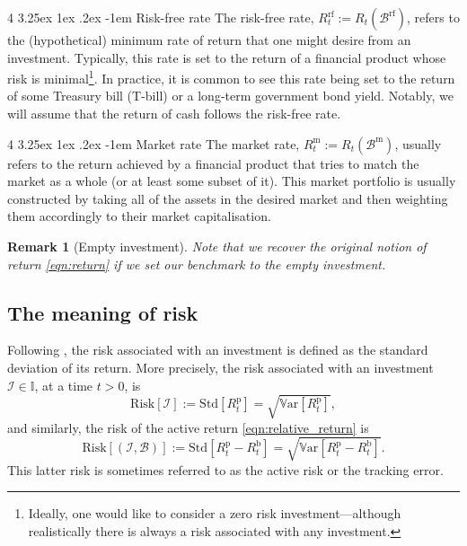 \documentclass[12pt]{article}
\makeatletter
\newtheorem{remark}{Remark}[section]
\renewcommand\paragraph{%
	\@startsection{paragraph}
	{4}
	{\z@}
	{3.25ex \@plus1ex \@minus.2ex}
	{-1em}
	{\normalfont\normalsize\bfseries\maybe@addperiod}%
}
\newcommand{\maybe@addperiod}[1]{%
	#1\@addpunct{.}%
}
\makeatother
\begin{document}
\paragraph{Risk-free rate} The risk-free rate, $R_t^{\text{rf}} := R_t(\mathcal{B}^{\text{rf}})$, refers to the (hypothetical) minimum rate of return that one might desire from an investment. Typically, this rate is set to the return of a financial product whose risk is minimal\footnote{Ideally, one would like to consider a zero risk investment---although realistically there is always a risk associated with any investment.}. In practice, it is common to see this rate being set to the return of some Treasury bill (T-bill) or a long-term government bond yield. Notably, we will assume that the return of cash follows the risk-free rate.

\paragraph{Market rate} The market rate, $R_t^{\text{m}} := R_t(\mathcal{B}^{\text{m}})$, usually refers to the return achieved by a financial product that tries to match the market as a whole (or at least some subset of it). This market portfolio is usually constructed by taking all of the assets in the desired market and then weighting them accordingly to their market capitalisation.

\begin{remark}
	[Empty investment] Note that we recover the original notion of return \eqref{eqn:return} if we set our benchmark to the empty investment.
\end{remark}

\subsection{The meaning of risk}
Following \cite{grinold1999}, the risk associated with an investment is defined as the standard deviation of its return. More precisely, the risk associated with an investment $\mathcal{I} \in \mathbb{I}$, at a time $t > 0$, is
\begin{equation}
	\text{Risk}[\mathcal{I}] := \text{Std}[R_t^{\text{p}}] = \sqrt{\mathbb{V}\text{ar}[R_t^{\text{p}}]},
\end{equation}
and similarly, the risk of the active return \eqref{eqn:relative_return} is 
\begin{equation}
	\text{Risk}[(\mathcal{I}, \mathcal{B})] := \text{Std}[R_t^{\text{p}} - R_t^{\text{b}}] = \sqrt{\mathbb{V}\text{ar}[R_t^{\text{p}} - R_t^{\text{b}}]}.
\end{equation}
This latter risk is sometimes referred to as the active risk or the tracking error.
\end{document}
